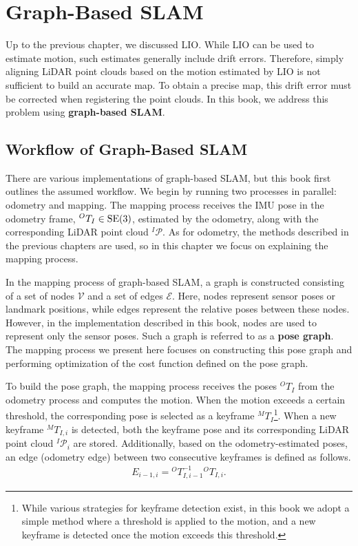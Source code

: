 \chapter{Graph-Based SLAM}

Up to the previous chapter, we discussed LIO.
While LIO can be used to estimate motion, such estimates generally include drift errors.
Therefore, simply aligning LiDAR point clouds based on the motion estimated by LIO is not sufficient to build an accurate map.
To obtain a precise map, this drift error must be corrected when registering the point clouds.
In this book, we address this problem using {\bf graph-based SLAM}.











\section{Workflow of Graph-Based SLAM}

There are various implementations of graph-based SLAM, but this book first outlines the assumed workflow.
We begin by running two processes in parallel: odometry and mapping.
The mapping process receives the IMU pose in the odometry frame, ${}^{O}T_{I} \in {\rm SE}(3)$, estimated by the odometry, along with the corresponding LiDAR point cloud ${}^{I}\mathcal{P}$.
As for odometry, the methods described in the previous chapters are used, so in this chapter we focus on explaining the mapping process.

In the mapping process of graph-based SLAM, a graph is constructed consisting of a set of nodes $\mathcal{V}$ and a set of edges $\mathcal{E}$.
Here, nodes represent sensor poses or landmark positions, while edges represent the relative poses between these nodes.
However, in the implementation described in this book, nodes are used to represent only the sensor poses.
Such a graph is referred to as a {\bf pose graph}.
The mapping process we present here focuses on constructing this pose graph and performing optimization of the cost function defined on the pose graph.

To build the pose graph, the mapping process receives the poses ${}^{O}T_{I}$ from the odometry process and computes the motion.
When the motion exceeds a certain threshold, the corresponding pose is selected as a keyframe ${}^{M}T_{I}$\footnote{ While various strategies for keyframe detection exist, in this book we adopt a simple method where a threshold is applied to the motion, and a new keyframe is detected once the motion exceeds this threshold. }.
When a new keyframe ${}^{M}T_{I,i}$ is detected, both the keyframe pose and its corresponding LiDAR point cloud ${}^{I}\mathcal{P}_{i}$ are stored.
Additionally, based on the odometry-estimated poses, an edge (odometry edge) between two consecutive keyframes is defined as follows.
%
\begin{align}
  E_{i-1, i} = {}^{O}T_{I, i-1}^{-1} {}^{O}T_{I, i}.
  \label{eq:odometry_edge}
\end{align}
%

